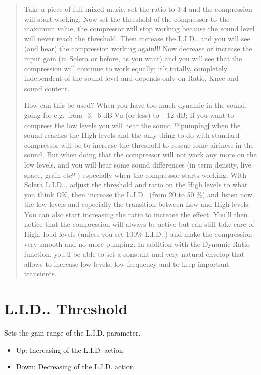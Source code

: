 \documentclass[
  letterpaper,
  DIV=11,
  numbers=noendperiod]{scrreport}
\providecommand{\tightlist}{%
  \setlength{\itemsep}{0pt}\setlength{\parskip}{0pt}}\usepackage{longtable,booktabs,array}
\begin{document}
\begin{quote}
Take a piece of full mixed music, set the ratio to 3-4 and the
compression will start working. Now set the threshold of the compressor
to the maximum value, the compressor will stop working because the sound
level will never reach the threshold. Then increase the L.I.D.. and you
will see (and hear) the compression working again!!! Now decrease or
increase the input gain (in Solera or before, as you want) and you will
see that the compression will continue to work equally; it's totally,
completely independent of the sound level and depends only on Ratio,
Knee and sound content.

How can this be used? When you have too much dynamic in the sound, going
for e.g.~from -3, -6 dB Vu (or less) to +12 dB; If you want to compress
the low levels you will hear the sound ™pumping∫ when the sound reaches
the High levels and the only thing to do with standard compressor will
be to increase the threshold to rescue some airiness in the sound. But
when doing that the compressor will not work any more on the low levels,
and you will hear some sound differences (in term density, live space,
grain etcº ) especially when the compressor starts working. With Solera
L.I.D.., adjust the threshold and ratio on the High levels to what you
think OK, then increase the L.I.D.. (from 20 to 50 \%) and listen now
the low levels and especially the transition between Low and High
levels. You can also start increasing the ratio to increase the effect.
You'll then notice that the compression will always be active but can
still take care of High, loud levels (unless you set 100\% L.I.D..) and
make the compression very smooth and no more pumping. In addition with
the Dynamic Ratio function, you'll be able to set a constant and very
natural envelop that allows to increase low levels, low frequency and to
keep important transients.
\end{quote}

\hypertarget{l.i.d..-threshold}{%
\section{L.I.D.. Threshold}\label{l.i.d..-threshold}}

Sets the gain range of the L.I.D. parameter.

\begin{itemize}
\tightlist
\item
  Up: Increasing of the L.I.D. action
\item
  Down: Decreasing of the L.I.D. action
\end{itemize}
\end{document}

